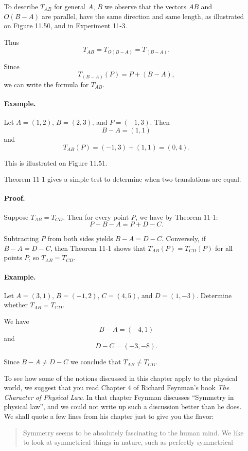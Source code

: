 \documentclass[12pt]{book} %
\begin{document}
\begin{ExerciseList}
To describe $T_{AB}$ for general $A$, $B$ we observe that the vectors
$AB$
and
$O(B-A)$
are parallel, have the same direction and same length, as illustrated on
Figure 11.50, and in Experiment 11-3.


Thus
\[
T_{AB}=T_{O(B-A)}=T_{(B-A)}.
\]

Since
\[
T_{(B-A)}(P)=P+(B-A),
\]
we can write the formula for $T_{AB}$.


\paragraph{Example.}
Let $A=(1,2)$, $B=(2,3)$, and $P=(-1,3)$. Then
\[
B-A=(1,1)
\]
and
\[
T_{AB}(P)=(-1,3)+(1,1)=(0,4).
\]

This is illustrated on Figure 11.51.


Theorem 11-1 gives a simple test to determine when two translations
are equal.


\paragraph{Proof.}
Suppose $T_{AB}=T_{CD}$.
Then for every point $P$, we have by
Theorem 11-1:
\[
P+B-A=P+D-C.
\]

Subtracting $P$ from both sides yields $B-A=D-C$. Conversely, if
$B-A=D-C$, then Theorem 11-1 shows that $T_{AB}(P)=T_{CD}(P)$ for all
points $P$, so $T_{AB}=T_{CD}$.

\paragraph{Example.}
Let $A=(3,1)$, $B=(-1,2)$, $C=(4,5)$, and $D=(1,-3)$.
Determine whether $T_{AB}=T_{CD}$.

We have
\[
B-A=(-4,1)
\]
and
\[
D-C=(-3,-8).
\]

Since $B-A\ne D-C$ we conclude that $T_{AB}\ne T_{CD}$.

To see how some of the notions discussed in this chapter apply to the
physical world, we suggest that you read Chapter 4 of Richard Feynman's book \textit{The Character of Physical Law}. In that chapter Feynman
discusses ``Symmetry in physical law'', and we could not write up such a
discussion better than he does. We shall quote a few lines from his
chapter just to give you the flavor:
\begin{quote}
Symmetry seems to be absolutely fascinating to the human mind. We
like to look at symmetrical things in nature, such as perfectly symmetrical
\end{quote}


\end{ExerciseList}
\end{document}
